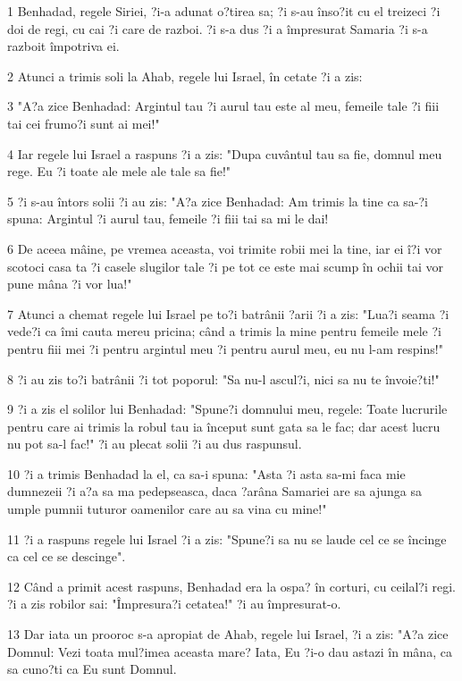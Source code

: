 \par 1 Benhadad, regele Siriei, ?i-a adunat o?tirea sa; ?i s-au înso?it cu el treizeci ?i doi de regi, cu cai ?i care de razboi. ?i s-a dus ?i a împresurat Samaria ?i s-a razboit împotriva ei.
\par 2 Atunci a trimis soli la Ahab, regele lui Israel, în cetate ?i a zis:
\par 3 "A?a zice Benhadad: Argintul tau ?i aurul tau este al meu, femeile tale ?i fiii tai cei frumo?i sunt ai mei!"
\par 4 Iar regele lui Israel a raspuns ?i a zis: "Dupa cuvântul tau sa fie, domnul meu rege. Eu ?i toate ale mele ale tale sa fie!"
\par 5 ?i s-au întors solii ?i au zis: "A?a zice Benhadad: Am trimis la tine ca sa-?i spuna: Argintul ?i aurul tau, femeile ?i fiii tai sa mi le dai!
\par 6 De aceea mâine, pe vremea aceasta, voi trimite robii mei la tine, iar ei î?i vor scotoci casa ta ?i casele slugilor tale ?i pe tot ce este mai scump în ochii tai vor pune mâna ?i vor lua!"
\par 7 Atunci a chemat regele lui Israel pe to?i batrânii ?arii ?i a zis: "Lua?i seama ?i vede?i ca îmi cauta mereu pricina; când a trimis la mine pentru femeile mele ?i pentru fiii mei ?i pentru argintul meu ?i pentru aurul meu, eu nu l-am respins!"
\par 8 ?i au zis to?i batrânii ?i tot poporul: "Sa nu-l ascul?i, nici sa nu te învoie?ti!"
\par 9 ?i a zis el solilor lui Benhadad: "Spune?i domnului meu, regele: Toate lucrurile pentru care ai trimis la robul tau ia început sunt gata sa le fac; dar acest lucru nu pot sa-l fac!" ?i au plecat solii ?i au dus raspunsul.
\par 10 ?i a trimis Benhadad la el, ca sa-i spuna: "Asta ?i asta sa-mi faca mie dumnezeii ?i a?a sa ma pedepseasca, daca ?arâna Samariei are sa ajunga sa umple pumnii tuturor oamenilor care au sa vina cu mine!"
\par 11 ?i a raspuns regele lui Israel ?i a zis: "Spune?i sa nu se laude cel ce se încinge ca cel ce se descinge".
\par 12 Când a primit acest raspuns, Benhadad era la ospa? în corturi, cu ceilal?i regi. ?i a zis robilor sai: "Împresura?i cetatea!" ?i au împresurat-o.
\par 13 Dar iata un prooroc s-a apropiat de Ahab, regele lui Israel, ?i a zis: "A?a zice Domnul: Vezi toata mul?imea aceasta mare? Iata, Eu ?i-o dau astazi în mâna, ca sa cuno?ti ca Eu sunt Domnul.
